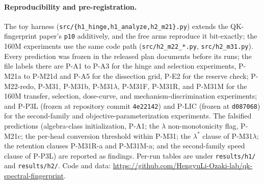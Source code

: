 \documentclass[11pt]{article}
\begin{document}
\paragraph{Reproducibility and pre-registration.} The toy harness
(\texttt{src/\{h1\_hinge,h1\_analyze,h2\_m21\}.py}) extends the QK-fingerprint paper's \texttt{p10} additively,
and the free arms reproduce it bit-exactly; the 160M experiments use the same code path
(\texttt{src/h2\_m22\_*.py}, \texttt{src/h2\_m31.py}). Every prediction was frozen in the released plan documents
before its runs; the file labels there are P-A1 to P-A3 for the hinge and selection experiments, P-M21a to P-M21d
and P-A5 for the dissection grid, P-E2 for the reserve check; P-M22-redo, P-M31, P-M31b, P-M31$\lambda$, P-M31F, P-M31R, and P-M31M for the 160M
transfer, selection, dose-curve, and mechanism-discrimination experiments; and P-P3L (frozen at repository commit
\texttt{4e22142}) and P-LIC (frozen at \texttt{d087068}) for the second-family and objective-parameterization
experiments. The falsified predictions (algebra-class
initialization, P-A1; the $\lambda$ non-monotonicity flag, P-M21c; the per-head conversion threshold within
P-M31; the $\lambda^{\ast}$ clause of P-M31$\lambda$; the retention clauses P-M31R-a and P-M31M-a; and the
second-family speed clause of P-P3L) are reported as findings. Per-run tables are under
\texttt{results/h1/} and \texttt{results/h2/}. Code and data:
\url{https://github.com/HengyuLi-Ozaki-lab/qk-spectral-fingerprint}.



\end{document}
